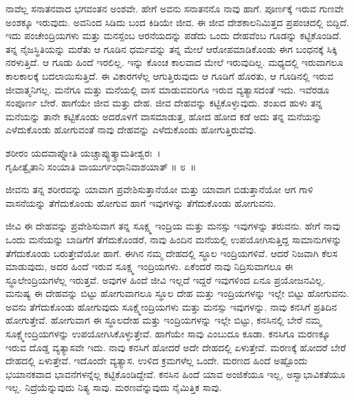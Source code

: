 ನಾವೆಲ್ಲ ಸನಾತನವಾದ ಭಗವಂತನ ಅಂಶವೇ. ಹೇಗೆ ಅವನು ಸನಾತನನೊ ನಾವು ಹಾಗೆ. ಪೂರ್ಣಕ್ಕೆ ಇರುವ ಗುಣವೇ ಅಂಶಕ್ಕೂ ಇರುವುದು. ಅವನಿಂದ ಸಿಡಿದು ಬಂದ ಕಿಡಿಯೇ ಜೀವ. ಈ ಜೀವ ದೇಶಕಾಲನಿಮಿತ್ತದ ಪ್ರಪಂಚದಲ್ಲಿ ಬಿದ್ದಿದೆ. ಇದು ಪಂಚೇಂದ್ರಿಯಗಳು ಮತ್ತು ಮನಸ್ಸೆಂಬ ಆರನೆಯದನ್ನು ಪಡೆದು ಒಂದು ದೇಹವೆಂಬ ಗೂಡನ್ನು ಕಟ್ಟಿಕೊಂಡಿದೆ. ತನ್ನ ನೈಜಸ್ಥಿತಿಯನ್ನು ಮರೆತು ಆ ಗೂಡಿನ ಧರ್ಮವನ್ನು ತನ್ನ ಮೇಲೆ ಆರೋಪಮಾಡಿಕೊಂಡು ಈಗ ಬಂಧನಕ್ಕೆ ಸಿಕ್ಕಿ ನರಳುತ್ತಿದೆ. ಆ ಗೂಡು ಹಿಂದೆ ಇರಲಿಲ್ಲ. ಇನ್ನು ಕೊಂಚ ಕಾಲವಾದ ಮೇಲೆ ಇರುವುದಿಲ್ಲ. ಮಧ್ಯದಲ್ಲಿ ಇರುವಾಗಲೂ ಕಾಲಕಾಲಕ್ಕೆ ಬದಲಾಯಿಸುತ್ತಿದೆ. ಈ ವಿಕಾರಗಳೆಲ್ಲ ಆಗುತ್ತಿರುವುದು ಆ ಗೂಡಿಗೆ ಹೊರತು, ಆ ಗೂಡಿನಲ್ಲಿ ಇರುವ ಜೀವಾತ್ಮನಿಗಲ್ಲ. ಮನೆಗೂ ಮತ್ತು ಮನೆಯಲ್ಲಿ ವಾಸ ಮಾಡುವವರಿಗೂ ಇರುವ ವ್ಯತ್ಯಾಸದಂತೆ ಇದು. ಇವೆರಡೂ ಸಂಪೂರ್ಣ ಬೇರೆ. ಹಾಗೆಯೇ ಜೀವ ಮತ್ತು ದೇಹ. ಜೀವ ದೇಹವನ್ನು ಕಟ್ಟಿಕೊಳ್ಳುವುದು. ಶಂಖದ ಹುಳು ತನ್ನ ಮನೆಯನ್ನು ತಾನೇ ಕಟ್ಟಿಕೊಂಡು ಅದರೊಳಗೆ ವಾಸಮಾಡುತ್ತ, ಹೋದ ಹೋದ ಕಡೆ ಅದು ತನ್ನ ಮನೆಯನ್ನು ಎಳೆದುಕೊಂಡು ಹೋಗುವಂತೆ ನಾವು ದೇಹವನ್ನು ಎಳೆದುಕೊಂಡು ಹೋಗುತ್ತಿರುವೆವು.

\begin{shloka}
ಶರೀರಂ ಯದವಾಪ್ನೋತಿ ಯಚ್ಚಾಪ್ಯುತ್ಕ್ರಾಮತೀಶ್ವರಃ~।\\ಗೃಹೀತ್ವೈತಾನಿ ಸಂಯಾತಿ ವಾಯುರ್ಗಂಧಾನಿವಾಶಯಾತ್ \hfill॥ ೮~॥
\end{shloka}

\begin{artha}
ಜೀವನು ತನ್ನ ಶರೀರವನ್ನು ಯಾವಾಗ ಪ್ರವೇಶಿಸುತ್ತಾನೆಯೋ ಮತ್ತು ಯಾವಾಗ ಬಿಡುತ್ತಾನೆಯೋ ಆಗ ಗಾಳಿ ವಾಸನೆಯನ್ನು ತೆಗೆದುಕೊಂಡು ಹೋಗುವ ಹಾಗೆ ಇವುಗಳನ್ನು ತೆಗೆದುಕೊಂಡು ಹೋಗುವನು.
\end{artha}

ಜೀವಿ ಈ ದೇಹವನ್ನು ಪ್ರವೇಶಿಸುವಾಗ ತನ್ನ ಸೂಕ್ಷ್ಮ ಇಂದ್ರಿಯ ಮತ್ತು ಮನಸ್ಸು ಇವುಗಳನ್ನು ತರುವನು. ಹೇಗೆ ನಾವು ಒಂದು ಮನೆಯನ್ನು ಬಾಡಿಗೆಗೆ ತೆಗೆದುಕೊಂಡರೆ, ನಾವು ಹಿಂದಿನ ಮನೆಯಲ್ಲಿ ಉಪಯೋಗಿಸುತ್ತಿದ್ದ ಸಾಮಾನುಗಳನ್ನು ತೆಗೆದುಕೊಂಡು ಬರುತ್ತೇವೆಯೋ ಹಾಗೆ. ಈಗಿನ ನಮ್ಮ ದೇಹದಲ್ಲಿ ಸ್ಥೂಲ ಇಂದ್ರಿಯಗಳಿವೆ. ಆದರೆ ನಿಜವಾಗಿ ಕೆಲಸ ಮಾಡುವುದು, ಅದರ ಹಿಂದೆ ಇರುವ ಸೂಕ್ಷ್ಮ ಇಂದ್ರಿಯಗಳು. ಏಕೆಂದರೆ ನಾವು ನಿದ್ರಿಸುವಾಗಲೂ ಈ ಸ್ಥೂಲೇಂದ್ರಿಯಗಳೆಲ್ಲ ಇರುತ್ತವೆ. ಅವುಗಳ ಹಿಂದೆ ಜೀವಿ ಇಲ್ಲದೆ ಇದ್ದರೆ ಇವುಗಳಿಂದ ಏನೂ ಪ್ರಯೋಜನವಿಲ್ಲ. ಮನುಷ್ಯ ಈ ದೇಹವನ್ನು ಬಿಟ್ಟು ಹೋಗುವಾಗಲೂ ಸ್ಥೂಲ ದೇಹ ಮತ್ತು ಇಂದ್ರಿಯಗಳನ್ನು ಇಲ್ಲೇ ಬಿಟ್ಟು ಹೋಗುವನು. ಅವನು ತೆಗೆದುಕೊಂಡು ಹೋಗುವುದು ಸೂಕ್ಷ್ಮೇಂದ್ರಿಯಗಳು ಮತ್ತು ಮನಸ್ಸು ಇವುಗಳನ್ನು. ನಾವು ಕನಸಿಗೆ ಪ್ರತಿದಿನ ಹೋಗುತ್ತೇವೆ. ಹೋಗುವಾಗ ಈ ಸ್ಥೂಲದೇಹ ಮತ್ತು ಇಂದ್ರಿಯಗಳನ್ನು ಇಲ್ಲೇ ಬಿಟ್ಟು, ಕನಸಿನಲ್ಲಿ ಬೇರೆ ನಮ್ಮ ಸೂಕ್ಷ್ಮೇಂದ್ರಿಯಗಳನ್ನು ಉಪಯೋಗಿಸಿಕೊಳ್ಳುತ್ತೇವೆ. ಹಾಗೆಯೇ ಸಾವು ಎಂಬುದೂ ಕೂಡಾ. ಕನಸಿಗೂ ಮರಣಕ್ಕೂ ಇರುವ ದೊಡ್ಡ ವ್ಯತ್ಯಾಸವೇ ಇದು. ನಾವು ಕನಸಿಗೆ ಹೋದರೆ ಅದೇ ದೇಹದಲ್ಲಿ ಏಳುತ್ತೇವೆ. ಮರಣಕ್ಕೆ ಹೋದರೆ ಬೇರೆ ದೇಹದಲ್ಲಿ ಏಳುತ್ತೇವೆ. ಇದೊಂದೇ ವ್ಯತ್ಯಾಸ. ಉಳಿದ ಕ್ರಮಗಳೆಲ್ಲ ಒಂದೇ. ಮರಣದ ಹಿಂದೆ ಅಷ್ಟೊಂದು ಭಯಾನಕವಾದ ಭಾವನೆಗಳನ್ನೆಲ್ಲ ಕಟ್ಟಿಕೊಂಡಿದ್ದೇವೆ. ಕನಸಿನ ಹಿಂದೆ ಯಾವ ಅಂಜಿಕೆಯೂ ಇಲ್ಲ, ಅಸ್ವಾಭಾವಿಕತೆಯೂ ಇಲ್ಲ. ನಿದ್ರೆಯೆನ್ನುವುದು ನಿತ್ಯ ಸಾವು. ಮರಣವೆನ್ನುವುದು ನೈಮಿತ್ತಿಕ ಸಾವು.

